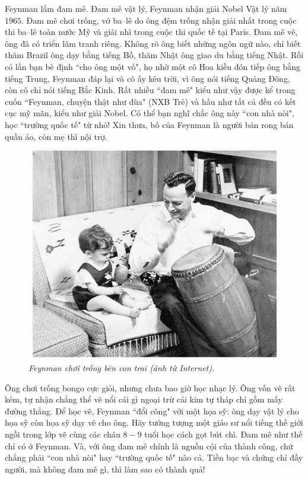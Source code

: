 \begin{multicols}{2}
	Feynman lắm đam mê. Đam mê vật lý, Feynman nhận giải Nobel Vật lý năm $1965$. Đam mê chơi trống, vở ba--lê do ông đệm trống nhận giải nhất trong cuộc thi ba--lê toàn nước Mỹ và giải nhì trong cuộc thi quốc tế tại Paris. Đam mê vẽ, ông đã có triển lãm tranh riêng. Không rõ ông biết những ngôn ngữ nào, chỉ biết thăm Brazil ông dạy bằng tiếng Bồ, thăm Nhật ông giao du bằng tiếng Nhật. Rồi có lần bạn bè định ``cho ông một vố", họ nhờ một cô Hoa kiều đón tiếp ông bằng tiếng Trung, Feynman đáp lại và cô ấy kêu trời, vì ông nói tiếng Quảng Đông, còn cô chỉ nói tiếng Bắc Kinh. Rất nhiều ``đam mê" kiểu như vậy được kể trong cuốn ``Feynman, chuyện thật như đùa" (NXB Trẻ) và hầu như tất cả đều có kết cục mỹ mãn, kiểu như giải Nobel. Có thể bạn nghĩ chắc ông này ``con nhà nòi", học ``trường quốc tế" từ nhỏ! Xin thưa, bố của Feynman là người bán rong bán quần áo, còn mẹ thì nội trợ. 
	\begin{figure}[H]
			\vspace*{-5pt}
			\centering
			\captionsetup{labelformat= empty, justification=centering}
			\includegraphics[width= 1\linewidth]{2a}
			\caption{\small\textit{\color{quantoan}Feynman chơi trống bên con trai (ảnh từ Internet).}}
			\vspace*{-10pt}
		\end{figure}
	Ông chơi trống bongo cực giỏi, nhưng chưa bao giờ học nhạc lý. Ông vốn vẽ rất kém, tự nhận chẳng thể vẽ nổi cái gì ngoại trừ cái kim tự tháp chỉ gồm mấy đường thẳng. Để học vẽ, Feynman ``đổi công" với một họa sỹ: ông dạy vật lý cho họa sỹ còn họa sỹ dạy vẽ cho ông. Hãy tưởng tượng một giáo sư nổi tiếng thế giới ngồi trong lớp vẽ cùng các cháu $8-9$ tuổi học cách gọt bút chì. Đam mê như thế chỉ có ở Feynman. Và, với ông đam mê chính là nguồn cội của thành công, chứ chẳng phải ``con nhà nòi" hay ``trường quốc tế" nào cả. Tiền bạc và chứng chỉ đầy người, mà không đam mê gì, thì làm sao có thành quả! 

\end{multicols}
